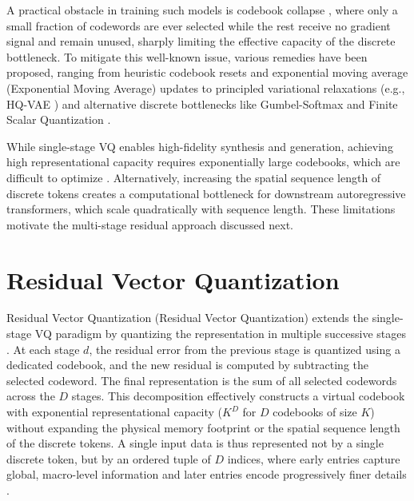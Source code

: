 \documentclass[12pt]{report}
\begin{document}
A practical obstacle in training such models is codebook collapse \cite{collapse_1, collapse_2}, where only a small fraction of codewords are ever selected while the rest receive no gradient signal and remain unused, sharply limiting the effective capacity of the discrete bottleneck. To mitigate this well-known issue, various remedies have been proposed, ranging from heuristic codebook resets and exponential moving average (Exponential Moving Average) updates to principled variational relaxations (e.g., HQ-VAE \cite{hqvae}) and alternative discrete bottlenecks like Gumbel-Softmax \cite{gumbelvq} and Finite Scalar Quantization \cite{finitescalarquantizationfsq}.

While single-stage VQ enables high-fidelity synthesis and generation, achieving high representational capacity requires exponentially large codebooks, which are difficult to optimize \cite{soundstream}. Alternatively, increasing the spatial sequence length of discrete tokens creates a computational bottleneck for downstream autoregressive transformers, which scale quadratically with sequence length. These limitations motivate the multi-stage residual approach discussed next.

\section{Residual Vector Quantization}
\label{sec:rvq}

Residual Vector Quantization (Residual Vector Quantization) extends the single-stage VQ paradigm by quantizing the representation in multiple successive stages \cite{soundstream}. At each stage $d$, the residual error from the previous stage is quantized using a dedicated codebook, and the new residual is computed by subtracting the selected codeword. The final representation is the sum of all selected codewords across the $D$ stages. This decomposition effectively constructs a virtual codebook with exponential representational capacity ($K^D$ for $D$ codebooks of size $K$) without expanding the physical memory footprint or the spatial sequence length of the discrete tokens. A single input data is thus represented not by a single discrete token, but by an ordered tuple of $D$ indices, where early entries capture global, macro-level information and later entries encode progressively finer details \cite{lee2022rqvae}.
\end{document}
